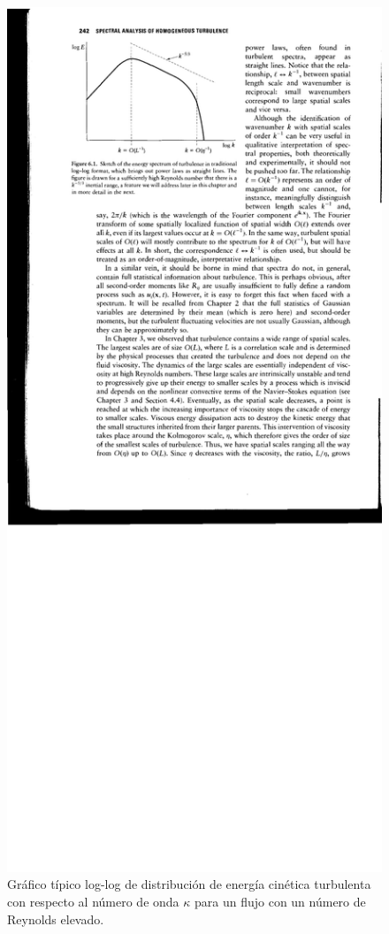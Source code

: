 \begin{figure}[h!]
	\centering
	\includegraphics[width=0.85\linewidth,trim={3.2cm 18.3cm 7.0cm 1.5cm},clip]{Imagenes/03/spectra}
	\caption{Gráfico típico log-log de distribución de energía cinética turbulenta con respecto al número de onda $\kappa$ para un flujo con un número de Reynolds elevado.}
	\label{fig:03_spectra}
\end{figure}

